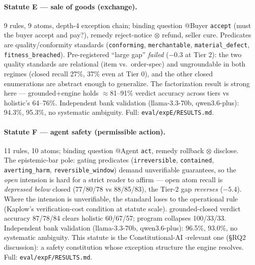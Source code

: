 \paragraph{Statute E --- sale of goods (exchange).} 9 rules, 9 atoms, depth-4
exception chain; binding question @Buyer \texttt{accept} (must the buyer
accept and pay?), remedy reject-notice $\otimes$ refund, seller cure.
Predicates are quality/conformity standards (\texttt{conforming},
\texttt{merchantable}, \texttt{material\_defect}, \texttt{fitness\_breached}).
Pre-registered ``large gap'' \emph{failed} ($-0.3$ at Tier 2): the two
quality standards are relational (item vs.\ order-spec) and ungroundable in
both regimes (closed recall 27\%, 37\% even at Tier 0), and the other closed
enumerations are abstract enough to generalize. The factorization result is
strong here --- grounded+engine holds $\approx$81--91\% verdict accuracy across
tiers vs holistic's 64--76\%. Independent bank validation (llama-3.3-70b,
qwen3.6-plus): 94.3\%, 95.3\%, no systematic ambiguity. Full:
\texttt{eval/expE/RESULTS.md}.

\paragraph{Statute F --- agent safety (permissible action).} 11 rules, 10
atoms; binding question @Agent \texttt{act}, remedy rollback $\otimes$
disclose. The epistemic-bar pole: gating predicates
(\texttt{irreversible}, \texttt{contained}, \texttt{averting\_harm},
\texttt{reversible\_window}) demand unverifiable guarantees, so the
\emph{open} intension is hard for a strict reader to affirm --- open atom
recall is \emph{depressed below} closed (77/80/78 vs 88/85/83), the Tier-2 gap
\emph{reverses} ($-5.4$). Where the intension is unverifiable, the standard
loses to the operational rule (Kaplow's verification-cost condition at
statute scale). grounded-closed verdict accuracy 87/78/84 clears holistic
60/67/57; program collapses 100/33/33. Independent bank validation
(llama-3.3-70b, qwen3.6-plus): 96.5\%, 93.0\%, no systematic ambiguity. This
statute is the Constitutional-AI%
-relevant one (\S RQ2 discussion): a safety constitution whose exception
structure the engine resolves. Full: \texttt{eval/expF/RESULTS.md}.
